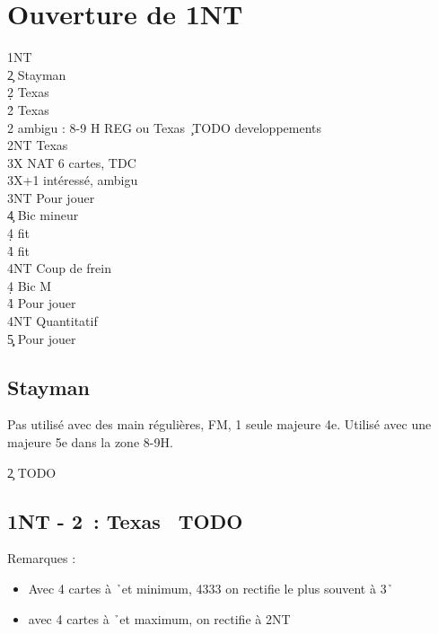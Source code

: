 \documentclass[a4paper]{article}
\begin{document}
\section{Ouverture de 1NT}

\begin{bidtable}
1NT\+\\
2\c \> Stayman\\
2\d \> Texas \h \\
2\h \> Texas \s \\
2\s \> ambigu : 8-9 H REG ou Texas \c\ TODO developpements\\
2NT \> Texas \d \\
3X \> NAT 6 cartes, TDC\+\\
3X+1 \> intéressé, ambigu\-\\
3NT \> Pour jouer\\
4\c \> Bic mineur\+\\
4\d \> fit \d \\
4\h\s \> fit \c \\
4NT \> Coup de frein\-\\
4\d \> Bic M\\
4\h\s \> Pour jouer\\
4NT \> Quantitatif\\
5\c\d \> Pour jouer\-
\end{bidtable}

\subsection{Stayman}

Pas utilisé avec des main régulières, FM, 1 seule majeure 4e.
Utilisé avec une majeure 5e dans la zone 8-9H.

\begin{bidtable}
2\c \> TODO
\end{bidtable}

\subsection{1NT - 2\pdfd\ : Texas \pdfh\ TODO}

Remarques :

\begin{itemize}
\item Avec 4 cartes à \h\ et minimum, 4333 on rectifie le plus souvent à 3\h\ 

\item avec 4 cartes à \h\ et maximum, on rectifie à 2NT

\end{itemize}
\end{document}
